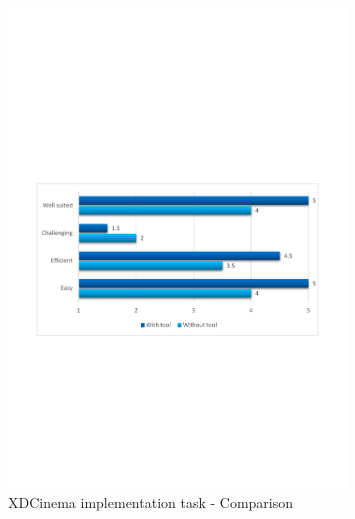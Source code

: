 \begin{figure}[H]
  \centering
    \includegraphics[width=0.8\textwidth]{images/charts/xdc_impl_comparison.pdf}
	\caption{XDCinema implementation task - Comparison}
	\label{fig:xdc_impl_comparison}
\end{figure}

